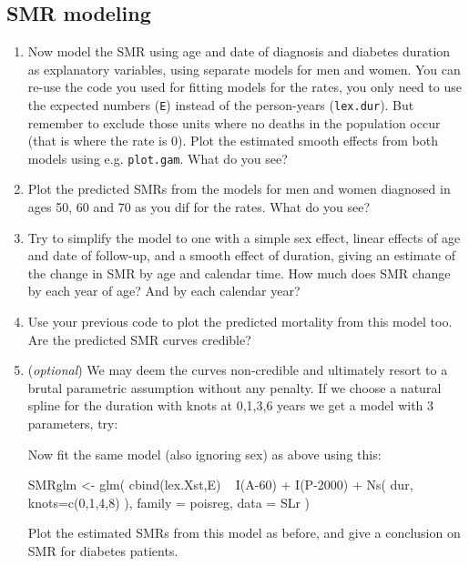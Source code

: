 \subsection{SMR modeling}
\begin{enumerate}[resume]
\item Now model the SMR using age and date of diagnosis and diabetes
  duration as explanatory variables, using separate models for
  men and women. 
  You can re-use the code you used for fitting models for the
  rates, you only need to use the expected numbers (\texttt{E})
  instead of the person-years (\texttt{lex.dur}). But remember to
  exclude those units where no deaths in the population occur (that
  is where the rate is 0).
  Plot the estimated smooth effects from both models using
  e.g. \texttt{plot.gam}. What do you see?
\item Plot the predicted SMRs from the models for men and women
  diagnosed in ages 50, 60 and 70 as you dif for the rates. What do
  you see?
\item Try to simplify the model to one with a simple sex effect,
  linear effects of age and date of follow-up, and a smooth effect of
  duration, giving an estimate of the change in SMR by age and
  calendar time. How much does SMR change by each year of age? And by
  each calendar year?
\item Use your previous code to plot the predicted mortality from this
  model too. Are the predicted SMR curves credible?
\item (\emph{optional}) We may deem the curves non-credible and
  ultimately resort to a brutal parametric assumption without any
  penalty. If we choose a natural spline for the duration with knots
  at 0,1,3,6 years we get a model with 3 parameters, try:
\begin{Schunk}
\end{Schunk}
  Now fit the same model (also ignoring sex) as above using this:
\begin{Schunk}
\begin{Sinput}
 SMRglm <- glm( cbind(lex.Xst,E) ~ I(A-60) + 
                                   I(P-2000) + 
                                   Ns( dur, knots=c(0,1,4,8) ),
                family = poisreg,
                  data = SLr )
\end{Sinput}
\end{Schunk}
  Plot the estimated SMRs from this model as before, and give a
  conclusion on SMR for diabetes patients.
\end{enumerate}
